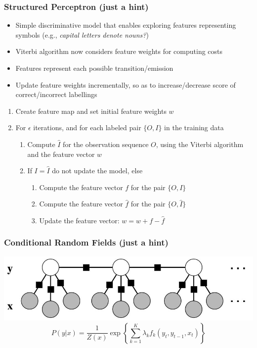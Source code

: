 \documentclass{beamer}
\begin{document}
\begin{frame} \frametitle{Structured Perceptron (just a hint)}
  
   \begin{itemize}
   \scriptsize
   \item Simple discriminative model that enables exploring features representing symbols (e.g., {\it capital letters denote nouns?})
   \item Viterbi algorithm now considers feature weights for computing costs
   \item Features represent each possible transition/emission
   \item Update feature weights incrementally, so as to increase/decrease score of correct/incorrect labellings
   \end{itemize}
  
   \begin{block}{}
   \begin{enumerate}
   \item Create feature map and set initial feature weights $w$
   \item For $\epsilon$ iterations, and for each labeled pair $\{O,I\}$ in the training data
   \begin{enumerate}
   \item Compute $\hat{I}$ for the observation sequence $O$, using the Viterbi algorithm and the feature vector $w$
   \item If $I=\hat{I}$ do not update the model, else
   \begin{enumerate}
   \item Compute the feature vector $f$ for the pair $\{O,I\}$
   \item Compute the feature vector $\hat{f}$ for the pair $\{O,\hat{I}\}$
   \item Update the feature vector: $w = w + f - \hat{f}$
   \end{enumerate}
   \end{enumerate}
   \end{enumerate}
   \end{block}
 
 \end{frame}

 \begin{frame}
     \frametitle{Conditional Random Fields (just a hint)}
     \centering
     \includegraphics[width=.9\linewidth]{crf}
     \begin{displaymath}
         P(y|x) = \frac{1}{Z(x)}\exp\left\{\sum_{k=1}^K\lambda_kf_k(y_t, y_{t-1}, x_t)\right\}
     \end{displaymath}
 \end{frame}
\end{document}
